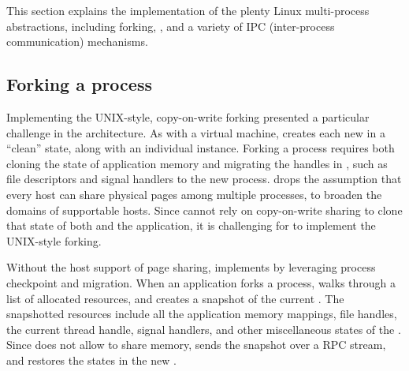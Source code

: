 This section explains the \thelibos{} implementation of
the plenty Linux multi-process abstractions,
including forking, , and a variety of IPC (inter-process communication) mechanisms. 




\subsection{Forking a process}



Implementing the UNIX-style, copy-on-write forking presented a particular challenge in the \thelibos{} architecture.
As with a virtual machine, \graphene{} creates each new \picoproc{} in a ``clean'' state, along with an individual \thelibos{} instance. %
Forking a process requires both cloning the state of application memory
and migrating the handles in \thelibos{}, such as file descriptors and signal handlers
to the new process.
\graphene{} drops the assumption that every host can share physical pages among multiple processes,
to broaden the domains of supportable hosts.
Since \thelibos{} cannot rely on copy-on-write sharing
to clone that state of both \thelibos{} and the application, it is challenging for \thelibos{} to implement the UNIX-style forking.


Without the host support of page sharing,
\thelibos{} implements  by leveraging process checkpoint and migration.
When an application forks a process,
\thelibos{} walks through a list of allocated resources,
and creates a snapshot of the current \picoproc{}.
The snapshotted resources include all the application memory mappings, file handles,
the current thread handle, signal handlers,
and other miscellaneous states of the \libos{}.
Since \graphene{} does not allow \picoprocs{} to share memory,
\thelibos{} sends the snapshot over a RPC stream,
and restores the states in the new \picoproc{}. %



